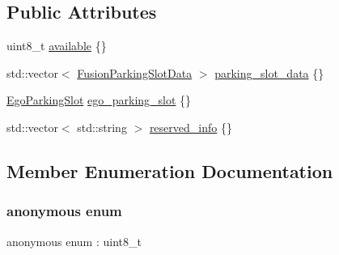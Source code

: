 \subsection*{Public Attributes}
\begin{DoxyCompactItemize}
\item 
uint8\+\_\+t \hyperlink{structmaf__perception__interface_1_1FusionParkingSlot_a7fc483585f5a8ad8bc3f641f37a6c5a7}{available} \{\}
\item 
std\+::vector$<$ \hyperlink{structmaf__perception__interface_1_1FusionParkingSlotData}{Fusion\+Parking\+Slot\+Data} $>$ \hyperlink{structmaf__perception__interface_1_1FusionParkingSlot_af4af9f11c9b18b027915ca3d26cdbfed}{parking\+\_\+slot\+\_\+data} \{\}
\item 
\hyperlink{structmaf__perception__interface_1_1EgoParkingSlot}{Ego\+Parking\+Slot} \hyperlink{structmaf__perception__interface_1_1FusionParkingSlot_a5f6a7680d5fb46b922327d49d1be57bc}{ego\+\_\+parking\+\_\+slot} \{\}
\item 
std\+::vector$<$ std\+::string $>$ \hyperlink{structmaf__perception__interface_1_1FusionParkingSlot_a0cfe2d838c1727c0594c675c9e99565e}{reserved\+\_\+info} \{\}
\end{DoxyCompactItemize}


\subsection{Member Enumeration Documentation}
\mbox{\label{structmaf__perception__interface_1_1FusionParkingSlot_a01968bcb5d4b40e847741bf6ea66a509}} 
\subsubsection{\texorpdfstring{anonymous enum}{anonymous enum}}
{\footnotesize\ttfamily anonymous enum \+: uint8\+\_\+t}

